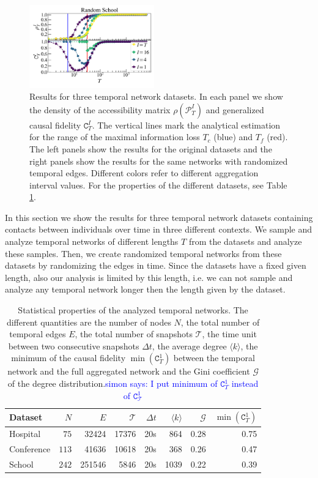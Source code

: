 \documentclass[%
 reprint,
 amsmath,amssymb,
 aps,
]{revtex4-2}
\newcommand{\simon}[1]{\textcolor{blue}{simon says: #1}}
\begin{document}
\begin{figure}[]
\includegraphics[width=0.48\textwidth]{fig/primaryschool_ET_cr_ana_leg.png}
\caption{\label{fig:dataPScf} 
Results for three temporal network datasets. 
In each panel we show the density of the accessibility matrix $\rho(\mathcal{P}^I_T)$ and generalized causal fidelity $\mathtt{C}^I_T$.
The vertical lines mark the analytical estimation for the range of the maximal information loss $T_c$ (blue) and $T_f$ (red).
The left panels show the results for the original datasets and the right panels show the results for the same networks with randomized temporal edges.  Different colors refer to different aggregation interval values. For the properties of the different datasets, see Table \ref{tab:datastats}.
}
\end{figure}


In this section we show the results for three temporal network datasets containing contacts between individuals over time in three different contexts. We sample and analyze temporal networks of different lengths $T$ from the datasets and analyze these samples. Then, we create randomized temporal networks from these datasets by randomizing the edges in time. Since the datasets have a fixed given length, also our analysis is limited by this length, i.e. we can not sample and analyze any temporal network longer then the length given by the dataset. 


\begin{table}[h!]
\centering
\begin{tabular}{lrrrrrrr}
\hline
 Dataset       &   $N$  &    $E$&    $\mathcal{T}$ &  $\Delta t$ &   {$\langle k \rangle$}   & $\mathcal{G}$  & $\min (\mathtt{C}^1_T)$ \\ %
\hline
Hospital       &       $75$ &    32424 &    17376 &    20s  &  864   & 0.28   &  0.75\\ %
Conference      &      $113$ &    41636 &    10618 &    20s  &  368   & 0.26   &  0.47\\ %
School &                $242$ &   251546 &     5846 &    20s  & 1039   &  0.22  &  0.39\\  %
\hline
\end{tabular}
\caption{Statistical properties of the analyzed temporal networks. The different quantities are the number of nodes $N$, the total number of temporal edges $E$,  the total number of snapshots $\mathcal{T}$, the time unit between two consecutive snapshots $\Delta t$,  the average degree $\langle k \rangle$,  the minimum of the causal fidelity $\min (\mathtt{C}^1_T)$ between the temporal network and the full aggregated network and the Gini coefficient $\mathcal{G}$ of the degree distribution.\simon{I put minimum of $\mathtt{C}_T^1$ instead of $\mathtt{C}_\mathcal{T}^1$}
}
\label{tab:datastats}
\end{table}
\end{document}
